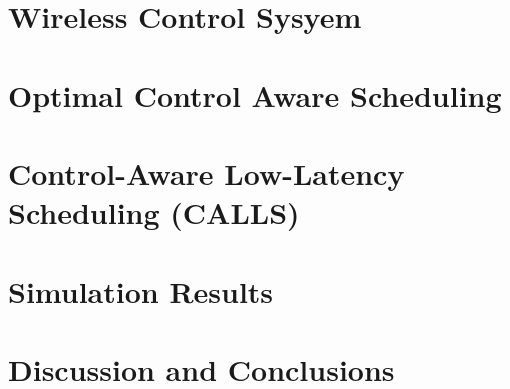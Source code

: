 \documentclass[journal]{IEEEtran}
\begin{document}
\section{Wireless Control Sysyem}\label{sec_problem_formulation}


\section{Optimal Control Aware Scheduling}\label{sec_optimal}


\section{Control-Aware Low-Latency Scheduling (CALLS)}\label{sec_calls}


\section{Simulation Results}\label{sec_simulation}


\section{Discussion and Conclusions}\label{sec_conclusion}






\end{document}
